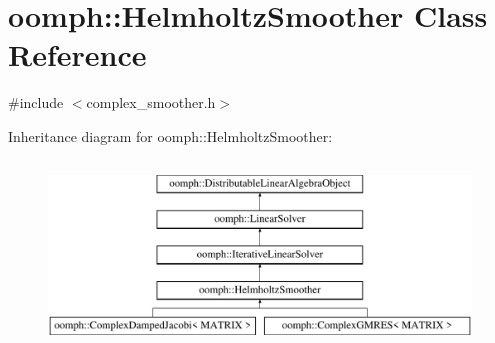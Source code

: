 \hypertarget{classoomph_1_1HelmholtzSmoother}{}\section{oomph\+:\+:Helmholtz\+Smoother Class Reference}
\label{classoomph_1_1HelmholtzSmoother}


{\ttfamily \#include $<$complex\+\_\+smoother.\+h$>$}

Inheritance diagram for oomph\+:\+:Helmholtz\+Smoother\+:\begin{figure}[H]
\begin{center}
\leavevmode
\includegraphics[height=5.000000cm]{classoomph_1_1HelmholtzSmoother}
\end{center}
\end{figure}
